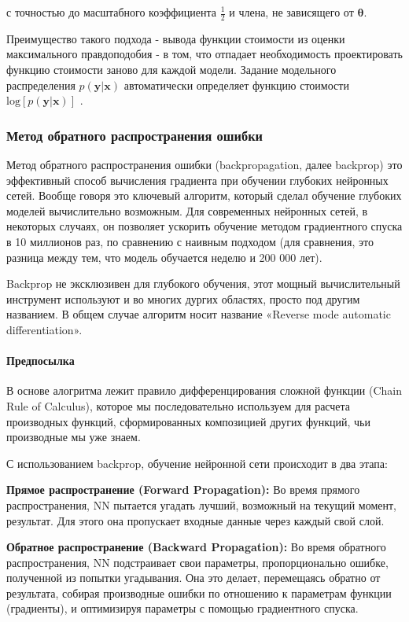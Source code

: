 с точностью до масштабного коэффициента $\frac{1}{2}$ и члена, не зависящего от 
$\bm{\theta}$. 

Преимущество такого подхода - вывода функции стоимости из оценки максимального 
правдоподобия - в том, что отпадает необходимость проектировать функцию 
стоимости заново для каждой модели. Задание модельного распределения $p(\bm{y} | \bm{x})$ 
автоматически определяет функцию стоимости $\text{log} \left[ p(\bm{y} | \bm{x}) \right]$ 
\cite{Goodfellow-et-al-2016}.

\subsubsection{Метод обратного распространения ошибки}

Метод обратного распространения ошибки (backpropagation, далее backprop) это 
эффективный способ вычисления градиента при обучении глубоких нейронных сетей. 
Вообще говоря это ключевый алгоритм, который сделал обучение глубоких моделей 
вычислительно возможным. Для современных нейронных сетей, в некоторых случаях, 
он позволяет ускорить обучение методом градиентного спуска в 10 миллионов раз, по 
сравнению с наивным подходом (для сравнения, это разница между тем, что модель 
обучается неделю и 200 000 лет). 

Backprop не эксклюзивен для глубокого обучения, этот мощный вычислительный 
инструмент используют и во многих дургих областях, просто под другим названием. 
В общем случае алгоритм носит название «Reverse mode automatic differentiation».

\paragraph{Предпосылка}

В основе алогритма лежит правило дифференцирования сложной функции 
(Chain Rule of Calculus), которое мы последовательно используем для 
расчета производных функций, сформированных композицией других функций, чьи 
производные мы уже знаем.

С использованием backprop, обучение нейронной сети происходит в два этапа:

\textbf{Прямое распространение (Forward Propagation):} 
Во время прямого распространения, NN пытается
угадать лучший, возможный на текущий момент, результат. 
Для этого она пропускает входные данные через 
каждый свой слой.

\textbf{Обратное распространение (Backward Propagation):} 
Во время обратного распространения, NN
подстраивает свои параметры, пропорционально ошибке, полученной из попытки
угадывания. Она это делает, перемещаясь обратно от результата, собирая
производные ошибки по отношению к параметрам функции (градиенты), и
оптимизируя параметры с помощью градиентного спуска.

